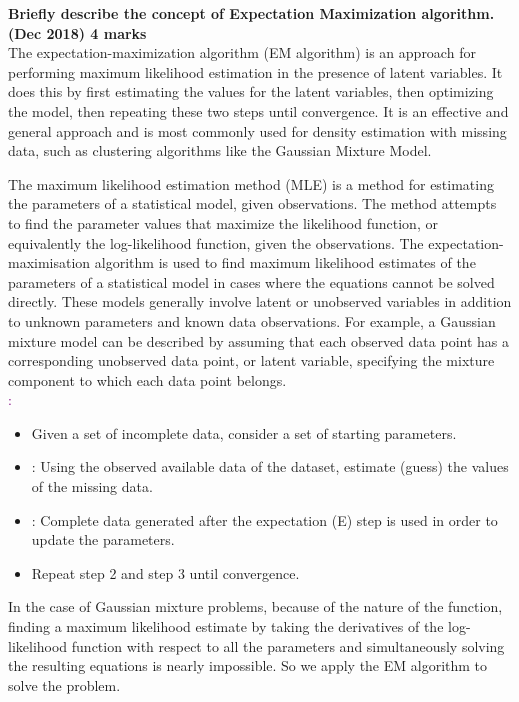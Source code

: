 
\textbf{\textcolor{LightMagenta}{Briefly describe the concept of Expectation Maximization algorithm. (Dec 2018) \hfill 4 marks}} \\[5pt]
The expectation-maximization algorithm (EM algorithm)  is an approach for performing maximum likelihood estimation in the presence of latent variables. It does this by first estimating the values for the latent variables, then optimizing the model, then repeating these two steps until convergence. It is an effective and general approach and is most commonly used for density estimation with missing data, such as clustering algorithms like the Gaussian Mixture Model.

The maximum likelihood estimation method (MLE) is a method for estimating the parameters of a statistical model, given observations. The method attempts to find the parameter values that maximize the likelihood function, or equivalently the log-likelihood function, given the observations. The expectation-maximisation algorithm is used to find maximum likelihood estimates of the parameters of a statistical model in cases where the equations cannot be solved directly. These models generally involve latent or unobserved variables in addition to unknown parameters and known data observations. For example, a Gaussian mixture model can be described by assuming that each observed data point has a corresponding unobserved data point, or latent variable, specifying the mixture component to which each data point belongs.\\

\textcolor{purple}{\underline{}:}

\begin{itemize}
    \item Given a set of incomplete data, consider a set of starting parameters.
    \item \textcolor{ReddishRose}{\underline{}:} Using the observed available data of the dataset, estimate (guess) the values of the missing data.
    \item \textcolor{ReddishRose}{\underline{}:} Complete data generated after the expectation (E) step is used in order to update the parameters.
    \item Repeat step 2 and step 3 until convergence.
\end{itemize}

In the case of Gaussian mixture problems, because of the nature of the function, finding a maximum likelihood estimate by taking the derivatives of the log-likelihood function with respect to all the parameters and simultaneously solving the resulting equations is nearly impossible. So we apply the EM algorithm to solve the problem.
